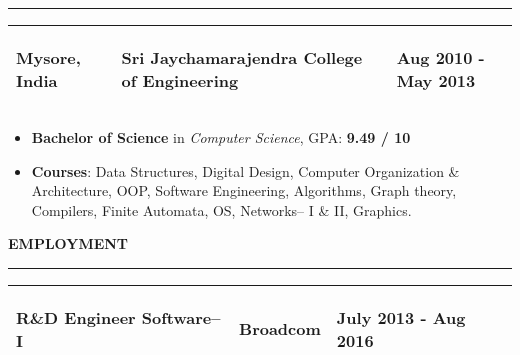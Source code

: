 \documentclass[a4paper, 10pt]{extarticle}
\begin{document}
\begin{large}
\hrule
\vspace{.1cm}
{\begin{tabular}{ p{3cm} p{10cm} p{4.4cm} }
    \textbf{Mysore, India} & \vspace{-.6cm} \begin{center}\textbf{{Sri
Jaychamarajendra College of Engineering}} \end{center} \vspace{-0.8cm} &
    \vspace{-0.6cm}
    \begin{flushright}
    \textbf{Aug 2010 - May 2013} 
    \end{flushright}
    \vspace{-0.7cm} \\
    \hline
\end{tabular}}
\vspace{-0.2cm}
\begin{itemize}
    \item {\textbf{Bachelor of Science} in \textit{Computer Science}, GPA:
\textbf{9.49 / 10}}
    \vspace{-.2cm}
    \item{\textbf{Courses}: Data Structures, Digital Design,  Computer
Organization \& Architecture, OOP, Software Engineering, Algorithms, Graph
theory, Compilers, Finite Automata, OS, Networks-- I \& II, Graphics.}
\end{itemize}
\vspace{.2cm}
{\LARGE{\textbf{E}}\Large{\textbf{MPLOYMENT}}}
\vspace{.1cm} \hrule \vspace{.1cm}
{\begin{tabular}{ p{6cm} p{5cm} p{6.5cm} }
    \textbf{R\&D Engineer Software--I} & \vspace{-.6cm}
\begin{center}\textbf{{Broadcom}} \end{center} \vspace{-0.8cm} & 
    \vspace{-0.7cm} 
    \begin{flushright} \textbf{July 2013 - Aug 2016} \end{flushright} 
    \vspace{-0.8cm}\\
    \hline
\end{tabular}}
\vspace{0.3cm} \\

\end{large}
\end{document}
